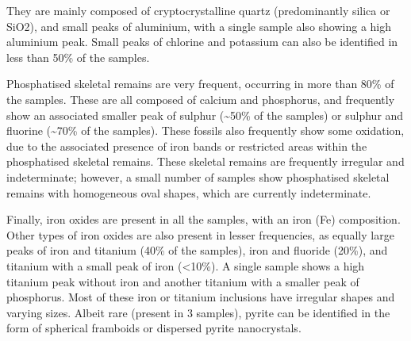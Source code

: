 \documentclass[
  a4paper,
  DIV=11,
  numbers=noendperiod]{scrreprt}
\begin{document}
They are mainly composed of cryptocrystalline quartz (predominantly
silica or SiO2), and small peaks of aluminium, with a single sample also
showing a high aluminium peak. Small peaks of chlorine and potassium can
also be identified in less than 50\% of the samples.

Phosphatised skeletal remains are very frequent, occurring in more than
80\% of the samples. These are all composed of calcium and phosphorus,
and frequently show an associated smaller peak of sulphur
(\textasciitilde50\% of the samples) or sulphur and fluorine
(\textasciitilde70\% of the samples). These fossils also frequently show
some oxidation, due to the associated presence of iron bands or
restricted areas within the phosphatised skeletal remains. These
skeletal remains are frequently irregular and indeterminate; however, a
small number of samples show phosphatised skeletal remains with
homogeneous oval shapes, which are currently indeterminate.

Finally, iron oxides are present in all the samples, with an iron (Fe)
composition. Other types of iron oxides are also present in lesser
frequencies, as equally large peaks of iron and titanium (40\% of the
samples), iron and fluoride (20\%), and titanium with a small peak of
iron (\textless10\%). A single sample shows a high titanium peak without
iron and another titanium with a smaller peak of phosphorus. Most of
these iron or titanium inclusions have irregular shapes and varying
sizes. Albeit rare (present in 3 samples), pyrite can be identified in
the form of spherical framboids or dispersed pyrite nanocrystals.
\end{document}
